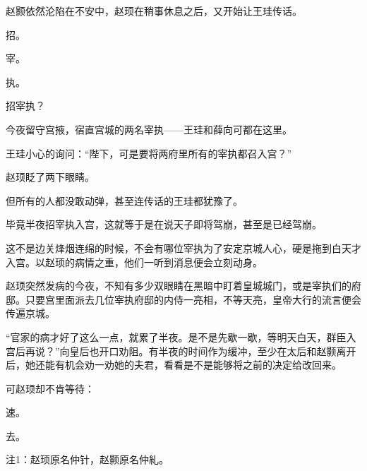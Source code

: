 赵颢依然沦陷在不安中，赵顼在稍事休息之后，又开始让王珪传话。

招。

宰。

执。

招宰执？

今夜留守宫掖，宿直宫城的两名宰执——王珪和薛向可都在这里。

王珪小心的询问：“陛下，可是要将两府里所有的宰执都召入宫？”

赵顼眨了两下眼睛。

但所有的人都没敢动弹，甚至连传话的王珪都犹豫了。

毕竟半夜招宰执入宫，这就等于是在说天子即将驾崩，甚至是已经驾崩。

这不是边关烽烟连绵的时候，不会有哪位宰执为了安定京城人心，硬是拖到白天才入宫。以赵顼的病情之重，他们一听到消息便会立刻动身。

赵顼突然发病的今夜，不知有多少双眼睛在黑暗中盯着皇城城门，或是宰执们的府邸。只要宫里面派去几位宰执府邸的内侍一亮相，不等天亮，皇帝大行的流言便会传遍京城。

“官家的病才好了这么一点，就累了半夜。是不是先歇一歇，等明天白天，群臣入宫后再说？”向皇后也开口劝阻。有半夜的时间作为缓冲，至少在太后和赵颢离开后，她还能有机会劝一劝她的夫君，看看是不是能够将之前的决定给改回来。

可赵顼却不肯等待：

速。

去。

注1：赵顼原名仲针，赵颢原名仲糺。
